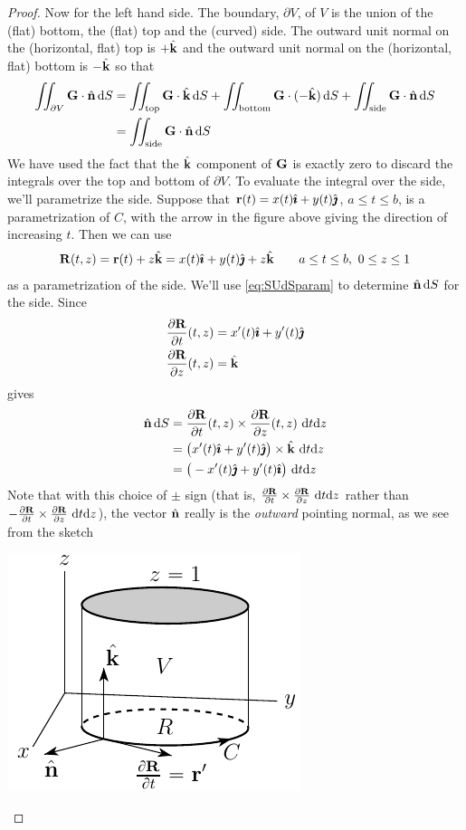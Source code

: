 \begin{proof}
Now for the left hand side. The boundary, $\partial V$, of $V$ is the union 
of the (flat) bottom, the (flat) top and the (curved) side.
The outward unit normal on the (horizontal, flat) top is $+\hat{\mathbf{k}}$ and
the outward unit normal on the (horizontal, flat) bottom is $-\hat{\mathbf{k}}$  so that
\begin{align*}
\iint_{\partial V} \mathbf{G}\cdot\hat{\mathbf{n}}\,\mathrm{d}S
&=\iint_{\text{top}} \mathbf{G}\cdot\hat{\mathbf{k}}\,\mathrm{d}S
   +\iint_{\text{bottom}} \mathbf{G}\cdot(-\hat{\mathbf{k}})\,\mathrm{d}S
   +\iint_{\text{side}} \mathbf{G}\cdot\hat{\mathbf{n}}\,\mathrm{d}S \\
&=\iint_{\text{side}} \mathbf{G}\cdot\hat{\mathbf{n}}\,\mathrm{d}S 
\end{align*}
We have used the fact that the $\hat{\mathbf{k}}$ component of $\mathbf{G}$ is exactly zero
to discard the integrals over the top and bottom of $\partial V$. 
To evaluate the integral over the side, we'll parametrize the side. Suppose that 
$\mathbf{r}(t)=x(t)\hat{\pmb{\imath}} +y(t)\hat{\pmb{\jmath}}$, $a\le t\le b$,
is a parametrization of $C$, with the arrow in the figure above giving the
direction of increasing $t$. Then we can use
\begin{align*}
\mathbf{R}(t,z)  = \mathbf{r}(t) +z\hat{\mathbf{k}}
          = x(t)\hat{\pmb{\imath}} +y(t)\hat{\pmb{\jmath}} +z\hat{\mathbf{k}} \qquad a\le t\le b,\ 0\le z\le 1
\end{align*}
as a parametrization of the side. We'll use \eqref{eq:SUdSparam} to determine
$\hat{\mathbf{n}}\,\mathrm{d}S$ for the side. Since
\begin{align*}
\frac{\partial\mathbf{R}}{\partial t}(t,z) & = x'(t)\hat{\pmb{\imath}} +y'(t)\hat{\pmb{\jmath}} \\
\frac{\partial\mathbf{R}}{\partial z}(t,z) & = \hat{\mathbf{k}} 
\end{align*}
 gives
\begin{align*}
\hat{\mathbf{n}}\,\mathrm{d}S &= \frac{\partial\mathbf{R}}{\partial t}(t,z)\times 
               \frac{\partial\mathbf{R}}{\partial z}(t,z)\ \mathrm{d}t\mathrm{d}z \\
&= \big(x'(t)\hat{\pmb{\imath}} +y'(t)\hat{\pmb{\jmath}}\big)\times \hat{\mathbf{k}}\ \mathrm{d}t\mathrm{d}z \\
&= \big(-x'(t)\hat{\pmb{\jmath}} +y'(t)\hat{\pmb{\imath}}\big)\ \mathrm{d}t\mathrm{d}z
\end{align*}
Note that with this choice of $\pm$ sign (that is, 
$\frac{\partial\mathbf{R}}{\partial t}\times 
               \frac{\partial\mathbf{R}}{\partial z}\ \mathrm{d}t\mathrm{d}z$
rather than
$-\frac{\partial\mathbf{R}}{\partial t}\times 
               \frac{\partial\mathbf{R}}{\partial z}\ \mathrm{d}t\mathrm{d}z$), the vector
$\hat{\mathbf{n}}$ really is the \emph{outward} pointing normal, as we see from the sketch
\begin{nfig}
\begin{center}
    \includegraphics{greens3.pdf}

\end{center}
\end{nfig}
\end{proof}

